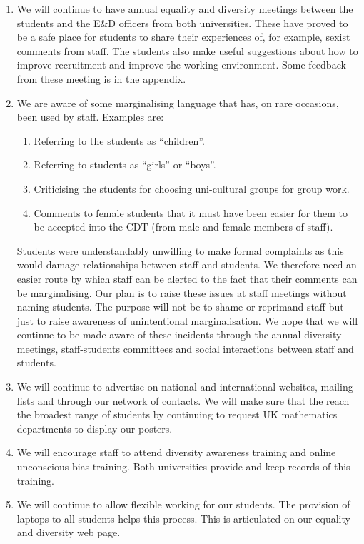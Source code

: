 \documentclass[12pt]{article}
\begin{document}
\begin{enumerate}
\item We will continue to have annual equality and diversity meetings between the students and the E\&D officers from both universities. These have proved to be a safe place for students to share their experiences of, for example, sexist comments from staff. The students also make useful suggestions about how to improve recruitment and improve the working environment. Some feedback from these meeting is in the appendix.

\item We are aware of some marginalising language that has, on rare occasions, been used by staff. Examples are:
\begin{enumerate}
\item Referring to the students as ``children''.
\item Referring to students as ``girls'' or ``boys''.
\item Criticising the students for choosing uni-cultural groups for group work.
\item Comments to female students that it must have been easier for them to be accepted into the CDT (from male and female members of staff).
\end{enumerate}
Students were understandably unwilling to make formal complaints as this would damage relationships between staff and students. We therefore need an easier route by which staff can be alerted to the fact that their comments can be marginalising. Our plan is to raise these issues at staff meetings without naming students. The purpose will not be to shame or reprimand staff but just to raise awareness of unintentional marginalisation. We hope that we will continue to be made aware of these incidents through the annual diversity meetings, staff-students committees and social interactions between staff and students. 

\item We will continue to advertise on national and international websites, mailing lists and through our network of contacts. We will make sure that the reach the broadest range of students by continuing to request UK mathematics departments to display our posters. 

\item We will encourage staff to attend diversity awareness training and online unconscious bias training. Both universities provide and keep records of this training. 

\item We will continue to allow flexible working for our students. The provision of laptops to all students helps this process. This is articulated on our equality and diversity web page.


\end{enumerate}
\end{document}
